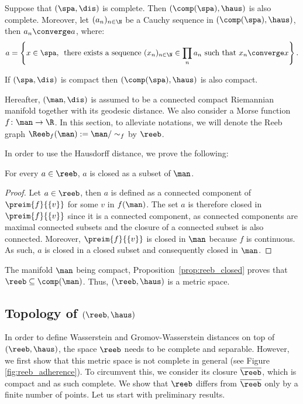 \begin{proposition}\label{prop:haus_limit}
Suppose that $(\spa,\dis)$ is complete. Then $(\comp(\spa),\haus)$ is also complete. Moreover, let $(a_n)_{n\in\N}$ be a Cauchy sequence in $(\comp(\spa),\haus)$, then $a_n\converge a$, where:
$$a=\left\{x \in \spa, \, \textrm{ there exists a sequence } (x_n)_{n\in\N}  \in \prod_n a_n  \textrm{ such that } x_n \converge x \right\}.$$
\end{proposition}

\begin{proposition}
If $(\spa,\dis)$ is compact then $(\comp(\spa),\haus)$ is also compact.
\end{proposition}

Hereafter, $(\man,\dis)$ is assumed to be a connected compact Riemannian manifold together with its geodesic distance. We also consider a Morse function $f\colon\man\rightarrow\R$. 
In this section, to alleviate notations, we will denote the Reeb graph $\Reeb_f(\man):=\man/\sim_{f}$ by $\reeb$.

In order to use the Hausdorff distance, we prove the following:

\begin{proposition}\label{prop:reeb_closed}For every $a\in\reeb$, $a$ is closed as a subset of $\man$.
\end{proposition}
\begin{proof}
Let $a\in\reeb$, then $a$ is defined as a connected component of $\preim{f}{\{v\}}$ for some $v$ in $f(\man)$. The set
$a$ is therefore closed in $\preim{f}{\{v\}}$ since it is a connected component, as connected components are maximal connected subsets and the closure of a connected subset is also connected. Moreover, $\preim{f}{\{v\}}$ is closed in $\man$ because $f$ is continuous. As such, $a$ is closed in a closed subset and consequently closed in $\man$.
\end{proof}

The manifold $\man$ being compact, Proposition~\ref{prop:reeb_closed} proves that $\reeb\subseteq\comp(\man)$. Thus, $(\reeb,\haus)$ is a metric space.

\subsection{Topology of \texorpdfstring{$(\reeb,\haus)$}{TEXT}}
In order to define Wasserstein and Gromov-Wasserstein distances on top of $(\reeb,\haus)$, the space $\reeb$ needs to be complete and separable. However, we first show that this metric space is not complete in general (see Figure \ref{fig:reeb_adherence}). To circumvent this, we consider its closure $\overline{\reeb}$, which is compact and as such complete. We show that $\reeb$ differs from $\overline{\reeb}$ only by a finite number of points. 
Let us start with preliminary results.

